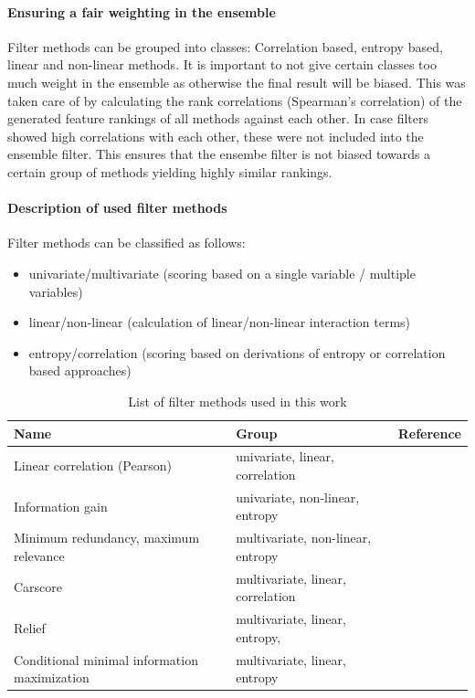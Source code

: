 \documentclass[letterpaper, journal]{IEEEtran}
\begin{document}
\paragraph{Ensuring a fair weighting in the ensemble}

Filter methods can be grouped into classes: Correlation based, entropy based, linear and non-linear methods.
It is important to not give certain classes too much weight in the ensemble as otherwise the final result will be biased.
This was taken care of by calculating the rank correlations (Spearman's correlation) of the generated feature rankings of all methods against each other.
In case filters showed high correlations with each other, these were not included into the ensemble filter.
This ensures that the ensembe filter is not biased towards a certain group of methods yielding highly similar rankings.

\paragraph{Description of used filter methods}

Filter methods can be classified as follows:

\begin{itemize}
	\item univariate/multivariate (scoring based on a single variable / multiple variables)
	\item linear/non-linear (calculation of linear/non-linear interaction terms)
	\item entropy/correlation (scoring based on derivations of entropy or correlation based approaches)
\end{itemize}

\begin{table}[b!]
\centering
\caption[t]{List of filter methods used in this work}
\begingroup\footnotesize
\begin{tabular}{lll}
	\\
	Name                                         & Group                             & Reference          \\
	\hline
	Linear correlation (Pearson)                 & univariate, linear, correlation   & \cite{pearson1901} \\
	Information gain                             & univariate, non-linear, entropy   & \cite{quinlan1986} \\
	Minimum redundancy, maximum relevance        & multivariate, non-linear, entropy & \cite{zhao2013}    \\
	Carscore                                     & multivariate, linear, correlation & \cite{zuber2011}   \\
	Relief                                       & multivariate, linear, entropy,    & \cite{kira1992}    \\
	Conditional minimal information maximization & multivariate, linear, entropy     & \cite{fleuret2004}
\end{tabular}
\endgroup
\label{tab:filter-methods}
\end{table}
\end{document}
